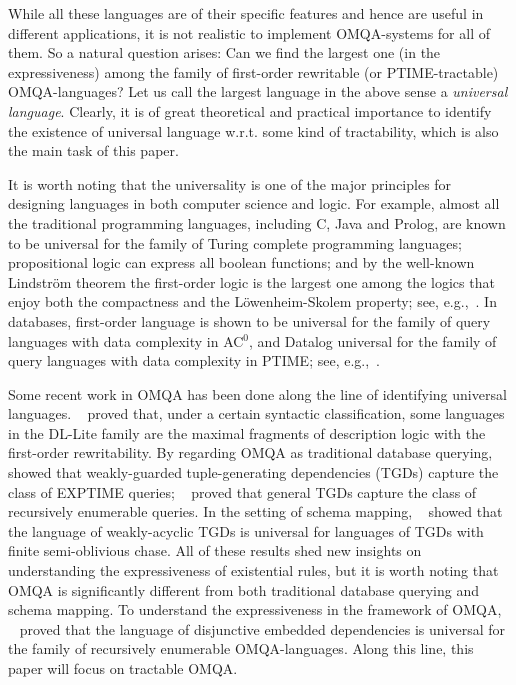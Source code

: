\documentclass[letterpaper]{article} %
\theoremstyle{definition}
\theoremstyle{remark}
\theoremstyle{definition}
\begin{document}
While all these languages are of their specific features and hence are useful in different applications, it is not realistic to implement OMQA-systems for all of them. So a natural question arises: Can we find the largest one (in the expressiveness) among the family of first-order rewritable (or PTIME-tractable) OMQA-languages? Let us call the largest language in the above sense a {\em universal language}. Clearly, it is of great theoretical and practical importance to identify the existence of universal language w.r.t. some kind of tractability, which is also the main task of this paper.

It is worth noting that the universality is one of the major principles for designing languages in both computer science and logic. For example, almost all the traditional programming languages, including C, Java and Prolog, are known to be universal for the family of Turing complete programming languages; propositional logic can express all boolean functions; and by the well-known Lindstr\"{o}m theorem the first-order logic is the largest one among the logics that enjoy both the compactness and the L\"{o}wenheim-Skolem property; see, e.g.,~\cite{EbbinghuasFT1994}. In databases, first-order language is shown to be universal for the family of query languages with data complexity in {AC}$^0$, and Datalog universal for the family of query languages with data complexity in PTIME; see, e.g.,~\cite{Immerman99}.

Some recent work in OMQA has been done along the line of identifying universal languages. \citeauthor{CalvaneseGLLR13}~ proved that, under a certain syntactic classification, some languages in the DL-Lite family are the maximal fragments of description logic with the first-order rewritability. By regarding OMQA as traditional database querying, \citeauthor{GRS2014}~ showed that weakly-guarded tuple-generating dependencies (TGDs) capture the class of EXPTIME queries; \citeauthor{RudolphT2015}~ proved that general TGDs capture the class of recursively enumerable queries. In the setting of schema mapping, \citeauthor{ZhangZY15}~ showed that the language of weakly-acyclic TGDs is universal for languages of TGDs with finite semi-oblivious chase. All of these results shed new insights on understanding the expressiveness of existential rules, but it is worth noting that OMQA is significantly different from both traditional database querying and schema mapping. To understand the expressiveness in the framework of OMQA, \citeauthor{ZhangZY16}~ proved that the language of disjunctive embedded dependencies is universal for the family of recursively enumerable OMQA-languages. Along this line, this paper will focus on tractable OMQA.
\end{document}
